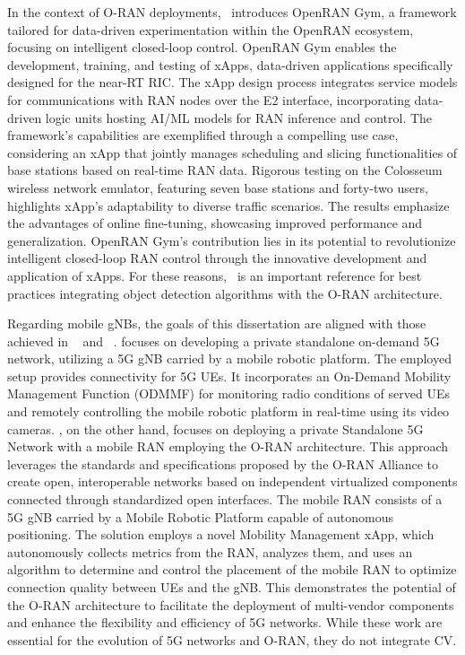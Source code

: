 In the context of O-RAN deployments,~\cite{xApps} introduces OpenRAN Gym, a framework tailored for data-driven experimentation within the OpenRAN ecosystem, focusing on intelligent closed-loop control.
OpenRAN Gym enables the development, training, and testing of xApps, data-driven applications specifically designed for the near-RT RIC. The xApp design process integrates service models for communications with RAN nodes over the E2 interface, incorporating data-driven logic units hosting AI/ML models for RAN inference and control.
The framework's capabilities are exemplified through a compelling use case, considering an xApp that jointly manages scheduling and slicing functionalities of base stations based on real-time RAN data.
Rigorous testing on the Colosseum wireless network emulator, featuring seven base stations and forty-two users, highlights xApp's adaptability to diverse traffic scenarios.
The results emphasize the advantages of online fine-tuning, showcasing improved performance and generalization.
OpenRAN Gym's contribution lies in its potential to revolutionize intelligent closed-loop RAN control through the innovative development and application of xApps.
For these reasons,~\cite{xApps} is an important reference for best practices integrating object detection algorithms with the O-RAN architecture.

Regarding mobile gNBs, the goals of this dissertation are aligned with those achieved in ~\cite{maia2022control} and ~\cite{queiros2023autonomous}.
\cite{maia2022control} focuses on developing a private standalone on-demand 5G network, utilizing a 5G gNB carried by a mobile robotic platform.
The employed setup provides connectivity for 5G UEs.
It incorporates an On-Demand Mobility Management Function (ODMMF) for monitoring radio conditions of served UEs and remotely controlling the mobile robotic platform in real-time using its video cameras.
\cite{queiros2023autonomous}, on the other hand, focuses on deploying a private Standalone 5G Network with a mobile RAN employing the O-RAN architecture.
This approach leverages the standards and specifications proposed by the O-RAN Alliance to create open, interoperable networks based on independent virtualized components connected through standardized open interfaces.
The mobile RAN consists of a 5G gNB carried by a Mobile Robotic Platform capable of autonomous positioning.
The solution employs a novel Mobility Management xApp, which autonomously collects metrics from the RAN, analyzes them, and uses an algorithm to determine and control the placement of the mobile RAN to optimize connection quality between UEs and the gNB.
This demonstrates the potential of the O-RAN architecture to facilitate the deployment of multi-vendor components and enhance the flexibility and efficiency of 5G networks.
While these work are essential for the evolution of 5G networks and O-RAN, they do not integrate CV\@.

